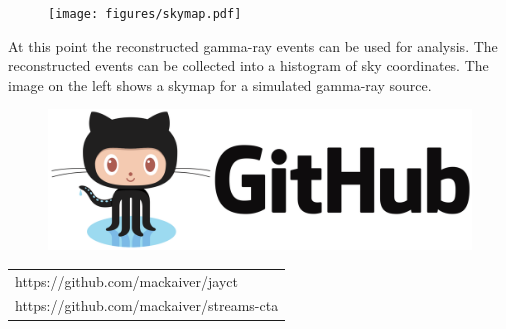 \begin{multicols}{2}
\begin{center}
        \begin{streamblock}[equal height group=C, width=0.8\linewidth]{-5mm}{0}{}%
          \begin{multicols}{2}
            \begin{figure}
              \texttt{[image: figures/skymap.pdf]}
            \end{figure}
            \columnbreak
            At this point the reconstructed gamma-ray events can be used for analysis.
            The reconstructed events can be collected into a histogram of sky coordinates.
            The image on the left shows a skymap for a simulated gamma-ray source.
          \end{multicols}
        \end{streamblock}%
        \vspace{3cm}
        \begin{multicols}{2}
            \begin{figure}
              \includegraphics[width=\linewidth]{logos/github.png}
            \end{figure}
            \columnbreak
                \vspace*{2cm}
                \begin{tabular}{l}
                https://github.com/mackaiver/jayct \\
                https://github.com/mackaiver/streams-cta
                \end{tabular}




          \end{multicols}


      \end{center}

\end{multicols}



